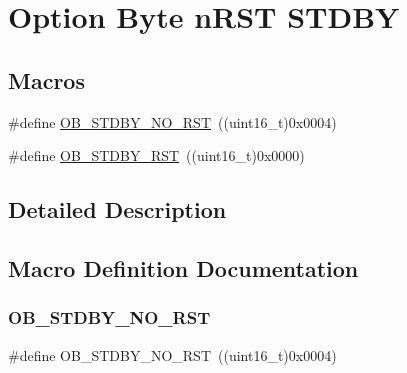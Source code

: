 \hypertarget{group___f_l_a_s_h_ex___o_b__n_r_s_t___s_t_d_b_y}{}\section{Option Byte n\+R\+ST S\+T\+D\+BY}
\label{group___f_l_a_s_h_ex___o_b__n_r_s_t___s_t_d_b_y}
\subsection*{Macros}
\begin{DoxyCompactItemize}
\item 
\#define \hyperlink{group___f_l_a_s_h_ex___o_b__n_r_s_t___s_t_d_b_y_gad776ed7b3b9a98013aac9976eedb7e94}{O\+B\+\_\+\+S\+T\+D\+B\+Y\+\_\+\+N\+O\+\_\+\+R\+ST}~((uint16\+\_\+t)0x0004)
\item 
\#define \hyperlink{group___f_l_a_s_h_ex___o_b__n_r_s_t___s_t_d_b_y_ga69451a6f69247528f58735c9c83499ce}{O\+B\+\_\+\+S\+T\+D\+B\+Y\+\_\+\+R\+ST}~((uint16\+\_\+t)0x0000)
\end{DoxyCompactItemize}


\subsection{Detailed Description}


\subsection{Macro Definition Documentation}
\mbox{\label{group___f_l_a_s_h_ex___o_b__n_r_s_t___s_t_d_b_y_gad776ed7b3b9a98013aac9976eedb7e94}} 
\subsubsection{\texorpdfstring{O\+B\+\_\+\+S\+T\+D\+B\+Y\+\_\+\+N\+O\+\_\+\+R\+ST}{OB\_STDBY\_NO\_RST}}
{\footnotesize\ttfamily \#define O\+B\+\_\+\+S\+T\+D\+B\+Y\+\_\+\+N\+O\+\_\+\+R\+ST~((uint16\+\_\+t)0x0004)}

